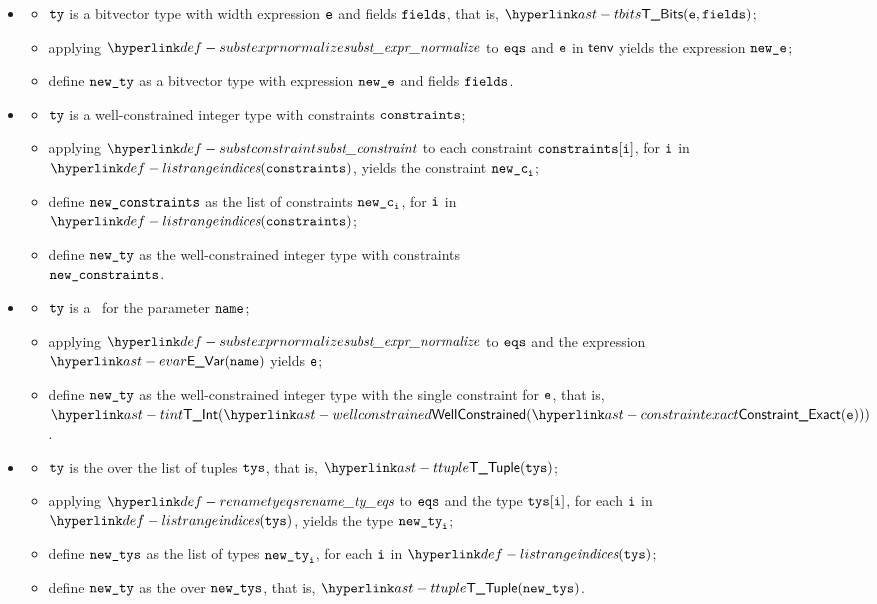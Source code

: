 \ProseParagraph
\OneApplies
\begin{itemize}
  \item {}
  \begin{itemize}
    \item $\texttt{ty}$ is a bitvector type with width expression $\texttt{e}$ and fields $\texttt{fields}$, that is, $\TBits(\ve, \fields)$;
    \item applying $\substexprnormalize$ to $\texttt{eqs}$ and $\texttt{e}$ in $\textsf{tenv}$ yields the expression $\texttt{new\_e}$;
    \item define $\texttt{new\_ty}$ as a bitvector type with expression $\texttt{new\_e}$ and fields $\texttt{fields}$.
  \end{itemize}

  \item {}
  \begin{itemize}
    \item $\texttt{ty}$ is a well-constrained integer type with constraints $\texttt{constraints}$;
    \item applying $\substconstraint$ to each constraint $\texttt{constraints}[\texttt{i}]$, for $\texttt{i}$ in \\
          $\listrange(\constraints)$, yields the constraint $\texttt{new\_c}_{\texttt{i}}$;
    \item define $\texttt{new\_constraints}$ as the list of constraints $\texttt{new\_c}_{\texttt{i}}$, for $\texttt{i}$ in \\
          $\listrange(\constraints)$;
    \item define $\texttt{new\_ty}$ as the well-constrained integer type with constraints \\
          $\texttt{new\_constraints}$.
  \end{itemize}

  \item {}
  \begin{itemize}
    \item $\texttt{ty}$ is a \parameterizedintegertype\ for the parameter $\texttt{name}$;
    \item applying $\substexprnormalize$ to $\texttt{eqs}$ and the expression $\EVar(\name)$ yields $\texttt{e}$;
    \item define $\texttt{new\_ty}$ as the well-constrained integer type with the single constraint for $\texttt{e}$, that is,
          $\TInt(\wellconstrained(\ConstraintExact(\ve)))$.
  \end{itemize}

  \item {}
  \begin{itemize}
    \item $\texttt{ty}$ is the \tupletypeterm{} over the list of tuples $\texttt{tys}$, that is, $\TTuple(\tys)$;
    \item applying $\renametyeqs$ to $\texttt{eqs}$ and the type $\texttt{tys}[\texttt{i}]$, for each $\texttt{i}$ in \\
          $\listrange(\tys)$, yields the type $\texttt{new\_ty}_{\texttt{i}}$;
    \item define $\texttt{new\_tys}$ as the list of types $\texttt{new\_ty}_{\texttt{i}}$, for each $\texttt{i}$ in $\listrange(\tys)$;
    \item define $\texttt{new\_ty}$ as the \tupletypeterm{} over $\texttt{new\_tys}$, that is, $\TTuple(\newtys)$.
  \end{itemize}


\end{itemize}
